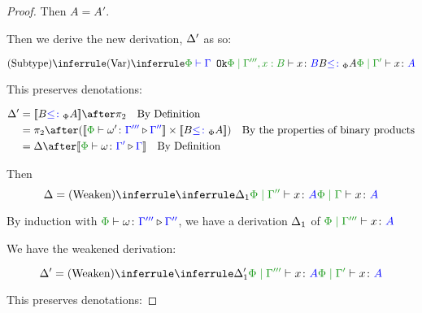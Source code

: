\documentclass{report}
\begin{document}
\begin{framed}
\begin{proof}
        
                Then $A = A'$.
        
                Then we derive the new derivation, $\Delta'$ as so:
        
                \begin{equation}
                    \ntreeruleII{\vsubtype}{
                        \ntreeruleI{\vvar}{\oke{\P}{\G}}{\etyperelation{\P}{\G''', x: B}{x}{B}}
                        }{
                        B \subtypep A
                    }{
                        \etyperelation{\P}{\G'}{x}{A}
                    }
                \end{equation}
        
                This preserves denotations:
        
                \begin{align*}
                    \D' & = \deno{B\subtypep A}\after\pp\qt{By Definition} \\
                     & = \pp\after (\deno{\ewrel{\P}{\w'}{\G'''}{\G''}}\times \deno{B\subtypep A}) \qt{By the properties of binary products}\\
                     & = \D\after\deno{\ewrel{\P}{\w}{\G'}{\G}}\qt{By Definition}
                \end{align*}
        
                Then 
                \begin{equation}
                    \D = \ntreeruleI{\vweaken}{\treeruleI{\D_1}{\etyperelation{\P}{\G''}{x}{A}}}{\gpetyperelation{x}{A}}
                \end{equation}
        
                By induction with $\ewrel{\P}{\w}{\G'''}{\G''}$,
                 we have a derivation $\Delta_1$ of $\etyperelation{\P}{\G'''}{x}{A}$
        
                We have the weakened derivation:
        
                \begin{equation}
                    \D' = \ntreeruleI{\vweaken}{\treeruleI{\D_1'}{\etyperelation{\P}{\G'''}{x}{A}}}{\etyperelation{\P}{\G'}{x}{A}}
                \end{equation}
        
                This preserves denotations:
        

\end{proof}
\end{framed}
\end{document}
